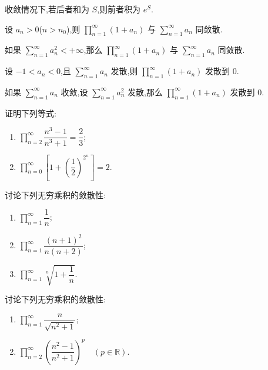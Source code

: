 \documentclass[../../数学分析培优讲义.tex]{subfiles}
\begin{document}
\begin{remark}
收敛情况下,若后者和为 $S$,则前者积为 $e^S$.
\end{remark}

\begin{theorem}[\markstar]
设 $a_n>0$($n>n_0$),则 $\displaystyle\prod\limits_{n=1}^{\infty}(1+a_n)$ 与 $\displaystyle\sum\limits_{n=1}^{\infty}a_n$ 同敛散.
\end{theorem}

\begin{theorem}[\markstar]
如果 $\displaystyle\sum\limits_{n=1}^{\infty}a_n^2<+\infty$,那么 $\displaystyle\prod\limits_{n=1}^{\infty}(1+a_n)$ 与 $\displaystyle\sum\limits_{n=1}^{\infty}a_n$ 同敛散.
\end{theorem}

\begin{theorem}
设 $-1<a_n<0$,且 $\displaystyle\sum\limits_{n=1}^{\infty}a_n$ 发散,则 $\displaystyle\prod\limits_{n=1}^{\infty}(1+a_n)$ 发散到 $0$.
\end{theorem}

\begin{theorem}
如果 $\displaystyle\sum\limits_{n=1}^{\infty}a_n$ 收敛,设 $\displaystyle\sum\limits_{n=1}^{\infty}a_n^2$ 发散,那么 $\displaystyle\prod\limits_{n=1}^{\infty}(1+a_n)$ 发散到 $0$.
\end{theorem}

\begin{example}
证明下列等式:
\begin{enumerate}[label=(\arabic*)]
    \item $\displaystyle\prod\limits_{n=2}^{\infty}\dfrac{n^3-1}{n^3+1}=\dfrac{2}{3}$;
    \item $\displaystyle\prod\limits_{n=0}^{\infty}\left[1+\left(\dfrac{1}{2}\right)^{2^n}\right]=2$.
\end{enumerate}
\end{example}
\exampleblank

\begin{example}
讨论下列无穷乘积的敛散性:
\begin{enumerate}[label=(\arabic*)]
    \item $\displaystyle\prod\limits_{n=1}^{\infty}\dfrac{1}{n}$;
    \item $\displaystyle\prod\limits_{n=1}^{\infty}\dfrac{(n+1)^2}{n(n+2)}$;
    \item $\displaystyle\prod\limits_{n=1}^{\infty}\sqrt[n]{1+\dfrac{1}{n}}$.
\end{enumerate}
\end{example}
\exampleblank

\begin{example}
讨论下列无穷乘积的敛散性:
\begin{enumerate}[label=(\arabic*)]
    \item $\displaystyle\prod\limits_{n=1}^{\infty}\dfrac{n}{\sqrt{n^2+1}}$;
    \item $\displaystyle\prod\limits_{n=2}^{\infty}\left(\dfrac{n^2-1}{n^2+1}\right)^p\quad(p\in\mathbb{R})$.
\end{enumerate}
\end{example}
\exampleblank
\end{document}
